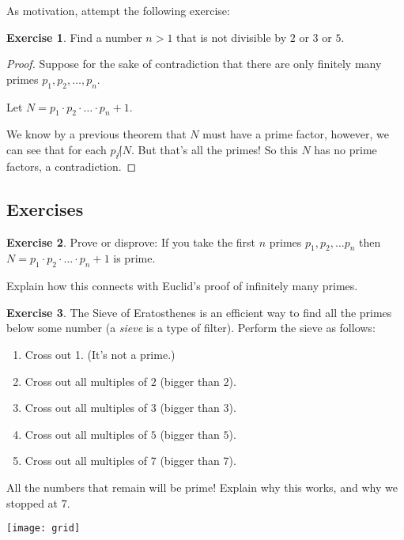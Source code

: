 \documentclass[11pt]{article}
\theoremstyle{definition}
\newtheorem{exercise}{Exercise}
\numberwithin{thm}{section}
\begin{document}
As motivation, attempt the following exercise:

\begin{exercise} Find a number $n > 1$ that is not divisible by $2$ or $3$ or $5$.
\end{exercise}

\begin{proof} Suppose for the sake of contradiction that there are only finitely many primes $p_1, p_2, \ldots, p_n$.

Let $N = p_1 \cdot p_2 \cdot \ldots \cdot p_n + 1$.

We know by a previous theorem that $N$ must have a prime factor, however, we can see that for each $p_i \not | N$. But that's all the primes! So this $N$ has no prime factors, a contradiction.
\end{proof}

\subsection{Exercises}

\begin{exercise} Prove or disprove: If you take the first $n$ primes $p_1, p_2, \ldots p_n$ then $N = p_1 \cdot p_2 \cdot \ldots \cdot p_n + 1$ is prime.

Explain how this connects with Euclid's proof of infinitely many primes.
\end{exercise}

\begin{exercise} The Sieve of Eratosthenes is an efficient way to find all the primes below some number (a \textit{sieve} is a type of filter). Perform the sieve as follows:
\begin{enumerate}
	\item Cross out 1. (It's not a prime.)
    \item Cross out all multiples of $2$ (bigger than $2$).
    \item Cross out all multiples of $3$ (bigger than $3$).
    \item Cross out all multiples of $5$ (bigger than $5$).
    \item Cross out all multiples of $7$ (bigger than $7$).
\end{enumerate}
All the numbers that remain will be prime! Explain why this works, and why we stopped at $7$.

\texttt{[image: grid]}
\end{exercise}
\end{document}
